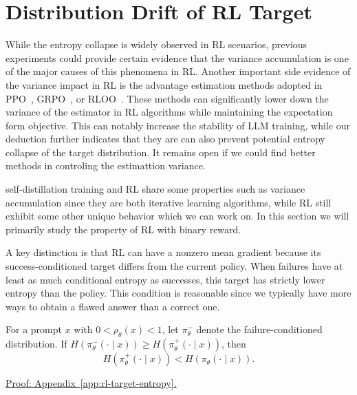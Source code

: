 \section{Distribution Drift of RL Target}

While the entropy collapse is widely observed in RL scenarios, previous experiments could provide certain evidence that the variance accumulation is one of the major causes of this phenomena in RL. Another important side evidence of the variance impact in RL is the advantage estimation methods adopted in PPO~\citep{schulman_proximal_2017}, GRPO~\citep{shao_deepseekmath_2024}, or RLOO~\citep{ahmadian_back_2024}. These methods can significantly lower down the variance of the estimator in RL algorithms while maintaining the expectation form objective. This can notably increase the stability of LLM training, while our deduction further indicates that they are can also prevent potential entropy collapse of the target distribution. It remains open if we could find better methods in controling the estimattion variance.



self-distillation training and RL share some properties such as variance accumulation since they are both iterative learning algorithms, while RL still exhibit some other unique behavior which we can work on. In this section we will primarily study the property of RL with binary reward.

A key distinction is that RL can have a nonzero mean gradient because its success-conditioned target differs from the current policy. When failures have at least as much conditional entropy as successes, this target has strictly lower entropy than the policy. This condition is reasonable since we typically have more ways to obtain a flawed answer than a correct one.

\begin{lemma}
\label{lem:rl-target-entropy}
For a prompt $x$ with $0<\rho_\theta(x)<1$, let $\pi_\theta^-$ denote the failure-conditioned distribution. If
$H(\pi_\theta^-(\cdot\mid x))\ge H(\pi_\theta^+(\cdot\mid x))$, then
\begin{equation}
 H(\pi_\theta^+(\cdot\mid x))<H(\pi_\theta(\cdot\mid x)).
 \label{eq:rl-target-entropy}
\end{equation}
\end{lemma}
\noindent\hyperref[app:rl-target-entropy]{Proof: Appendix~\ref*{app:rl-target-entropy}.}

